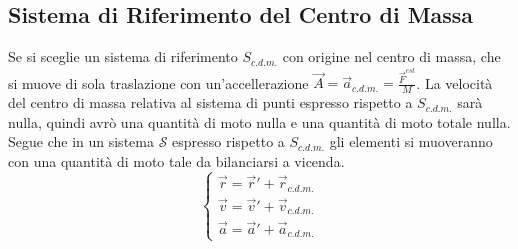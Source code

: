 \documentclass{article}
\numberwithin{equation}{subsection}
\begin{document}
\subsection{Sistema di Riferimento del Centro di Massa}
Se si sceglie un sistema di riferimento $S_{c.d.m.}$ con origine nel centro 
di massa, che si muove di sola traslazione con un'accellerazione 
$\vec{A}=\vec{a}_{c.d.m.}=\displaystyle\frac{\vec{F}^{est}}{M}$. 
La velocità del centro di massa relativa al sistema di punti espresso rispetto a $S_{c.d.m.}$ sarà nulla, quindi avrò una quantità di moto nulla e una quantità di moto 
totale nulla. Segue che in un sistema $\mathscr{S}$ espresso rispetto a $S_{c.d.m.}$ gli elementi 
si muoveranno con una quantità di moto tale da bilanciarsi a vicenda. 
\begin{equation*}
    \begin{cases}
        \vec{r}=\vec{r}'+\vec{r}_{c.d.m.}\\ 
        \vec{v}=\vec{v}'+\vec{v}_{c.d.m.}\\
        \vec{a}=\vec{a}'+\vec{a}_{c.d.m.}
    \end{cases}
\end{equation*}
\begin{center}\end{center}
\end{document}
